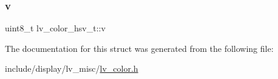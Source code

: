 \subsubsection{\texorpdfstring{v}{v}}
{\footnotesize\ttfamily uint8\+\_\+t lv\+\_\+color\+\_\+hsv\+\_\+t\+::v}



The documentation for this struct was generated from the following file\+:\begin{DoxyCompactItemize}
\item 
include/display/lv\+\_\+misc/\mbox{\hyperlink{lv__color_8h}{lv\+\_\+color.\+h}}\end{DoxyCompactItemize}
